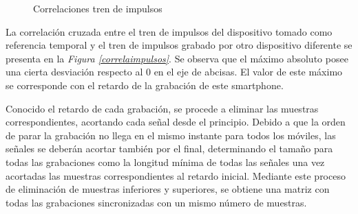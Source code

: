 \documentclass[a4paper,11pt]{book}
\begin{document}
\begin{figure}
 \centering
 \caption{Correlaciones tren de impulsos}
\end{figure}

La correlación cruzada entre el tren de impulsos del dispositivo tomado como referencia temporal y el tren de impulsos grabado por otro dispositivo diferente se presenta en la \textit{Figura \ref{correlaimpulsos}}. Se observa que el máximo absoluto posee una cierta desviación respecto al 0 en el eje de abcisas. El valor de este máximo se corresponde con el retardo de la grabación de este smartphone.

Conocido el retardo de cada grabación, se procede a eliminar las muestras correspondientes, acortando cada señal desde el principio. Debido a que la orden de parar la grabación no llega en el mismo instante para todos los móviles, las señales se deberán acortar también por el final, determinando el tamaño para todas las grabaciones como la longitud mínima de todas las señales una vez acortadas las muestras correspondientes al retardo inicial. Mediante este proceso de eliminación de muestras inferiores y superiores, se obtiene una matriz con todas las grabaciones sincronizadas con un mismo número de muestras.
\end{document}
